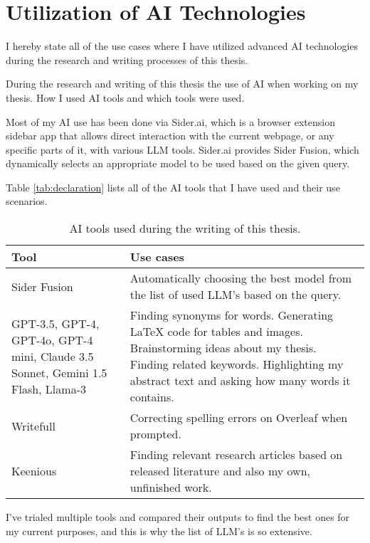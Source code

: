 



\chapter*{Utilization of AI Technologies\label{extra:declaration}}

I hereby state all of the use cases where I have utilized advanced AI technologies during the research and writing processes of this thesis.

During the research and writing of this thesis the use of AI when working on my thesis. How I used AI tools and which tools were used.

Most of my AI use has been done via Sider.ai, which is a browser extension sidebar app that allows direct interaction with the current webpage, or any specific parts of it, with various LLM tools. Sider.ai provides Sider Fusion, which dynamically selects an appropriate model to be used based on the given query.

Table \ref{tab:declaration} lists all of the AI tools that I have used and their use scenarios.

\begin{table}[h]
  \centering
  \begin{tabularx}{\textwidth}{X X}
    \hline
    \textbf{Tool} & \textbf{Use cases} \\
    \hline
    Sider Fusion & Automatically choosing the best model from the list of used LLM's based on the query. \\
    \hline
    GPT-3.5, GPT-4, GPT-4o, GPT-4 mini, Claude 3.5 Sonnet, Gemini 1.5 Flash, Llama-3 & Finding synonyms for words. Generating LaTeX code for tables and images. Brainstorming ideas about my thesis. Finding related keywords. Highlighting my abstract text and asking how many words it contains.\\
    \hline
    Writefull& Correcting spelling errors on Overleaf when prompted. \\
    \hline
    Keenious & Finding relevant research articles based on released literature and also my own, unfinished work. \\
    \hline
  \end{tabularx}
  \caption{AI tools used during the writing of this thesis.}
  \label{table:declaration}
\end{table}

I've trialed multiple tools and compared their outputs to find the best ones for my current purposes, and this is why the list of LLM's is so extensive.